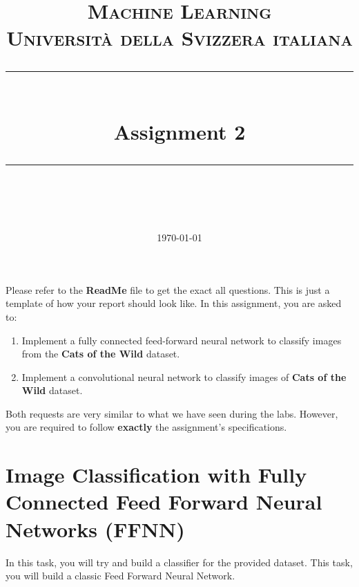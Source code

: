 \documentclass[11pt]{scrartcl}
\title{	
	\normalfont\normalsize
	\textsc{Machine Learning\\%
	Universit\`a della Svizzera italiana}\\
	\vspace{25pt}
	\rule{\linewidth}{0.5pt}\\
	\vspace{20pt}
	{\huge Assignment 2}\\
	\vspace{12pt}
	\rule{\linewidth}{1pt}\\
	\vspace{12pt}
}
\author{\LARGE \thestudent}
\date{\normalsize\today}
\begin{document}
\maketitle

Please refer to the \textbf{ReadMe} file to get the exact all questions. This is just a template of how your report should look like.
In this assignment, you are asked to:

\begin{enumerate}
\item Implement a fully connected feed-forward neural network to classify images from the \textbf{Cats of the Wild} dataset.

\item Implement a convolutional neural network to classify images of \textbf{Cats of the Wild} dataset.
\end{enumerate}

Both requests are very similar to what we have seen during the labs. However, you are required to follow \textbf{exactly} the assignment's specifications.

\section{Image Classification with Fully Connected Feed Forward Neural Networks (FFNN)}

In this task, you will try and build a classifier for the provided dataset. This task, you will build a classic Feed Forward Neural Network.
\end{document}
